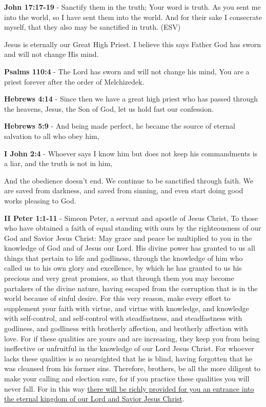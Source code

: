 \documentclass[11pt]{article}
\begin{document}
\textbf{John 17:17-19} - Sanctify them in the truth; Your word is truth. As you sent me into the world, so I have sent them into the world. And for their sake I consecrate myself, that they also may be sanctified in truth.  (ESV)

Jesus is eternally our Great High Priest. I believe this says Father God has sworn and will not change His mind.

\textbf{Psalms 110:4} - The Lord has sworn and will not change his mind, You are a priest forever after the order of Melchizedek.

\textbf{Hebrews 4:14} - Since then we have a great high priest who has passed through the heavens, Jesus, the Son of God, let us hold fast our confession.

\textbf{Hebrews 5:9} - And being made perfect, he became the source of eternal salvation to all who obey him,

\textbf{I John 2:4} - Whoever says I know him but does not keep his commandments is a liar, and the truth is not in him,

And the obedience doesn't end. We continue to be sanctified through faith. We are saved from darkness, and saved from sinning, and even start doing good works pleasing to God.

\textbf{II Peter 1:1-11} - Simeon Peter, a servant and apostle of Jesus Christ, To those who have obtained a faith of equal standing with ours by the righteousness of our God and Savior Jesus Christ: May grace and peace be multiplied to you in the knowledge of God and of Jesus our Lord.  His divine power has granted to us all things that pertain to life and godliness, through the knowledge of him who called us to his own glory and excellence, by which he has granted to us his precious and very great promises, so that through them you may become partakers of the divine nature, having escaped from the corruption that is in the world because of sinful desire.  For this very reason, make every effort to supplement your faith with virtue, and virtue with knowledge, and knowledge with self-control, and self-control with steadfastness, and steadfastness with godliness, and godliness with brotherly affection, and brotherly affection with love.  For if these qualities are yours and are increasing, they keep you from being ineffective or unfruitful in the knowledge of our Lord Jesus Christ.  For whoever lacks these qualities is so nearsighted that he is blind, having forgotten that he was cleansed from his former sins.  Therefore, brothers, be all the more diligent to make your calling and election sure, for if you practice these qualities you will never fall.  For in this way \uline{there will be richly provided for you an entrance into the eternal kingdom of our Lord and Savior Jesus Christ}.
\end{document}
